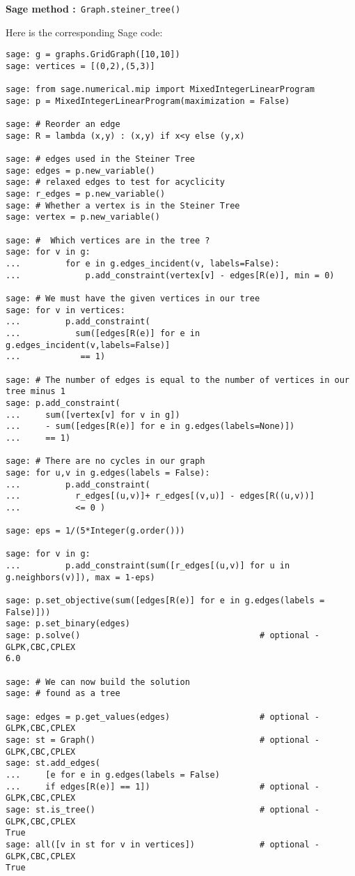 {\bf Sage method :}\verb! Graph.steiner_tree()!

Here is the corresponding Sage code:

\begin{lstlisting}
sage: g = graphs.GridGraph([10,10])
sage: vertices = [(0,2),(5,3)]

sage: from sage.numerical.mip import MixedIntegerLinearProgram
sage: p = MixedIntegerLinearProgram(maximization = False)

sage: # Reorder an edge
sage: R = lambda (x,y) : (x,y) if x<y else (y,x)

sage: # edges used in the Steiner Tree
sage: edges = p.new_variable()
sage: # relaxed edges to test for acyclicity
sage: r_edges = p.new_variable()
sage: # Whether a vertex is in the Steiner Tree
sage: vertex = p.new_variable()

sage: #  Which vertices are in the tree ?
sage: for v in g:
...         for e in g.edges_incident(v, labels=False):
...             p.add_constraint(vertex[v] - edges[R(e)], min = 0)

sage: # We must have the given vertices in our tree
sage: for v in vertices:
...         p.add_constraint(
...           sum([edges[R(e)] for e in g.edges_incident(v,labels=False)]
...            == 1)

sage: # The number of edges is equal to the number of vertices in our tree minus 1
sage: p.add_constraint(
...     sum([vertex[v] for v in g])
...     - sum([edges[R(e)] for e in g.edges(labels=None)])
...     == 1)

sage: # There are no cycles in our graph
sage: for u,v in g.edges(labels = False):
...         p.add_constraint(
...           r_edges[(u,v)]+ r_edges[(v,u)] - edges[R((u,v))]
...           <= 0 )

sage: eps = 1/(5*Integer(g.order()))

sage: for v in g:
...         p.add_constraint(sum([r_edges[(u,v)] for u in g.neighbors(v)]), max = 1-eps)

sage: p.set_objective(sum([edges[R(e)] for e in g.edges(labels = False)]))
sage: p.set_binary(edges)
sage: p.solve()                                    # optional - GLPK,CBC,CPLEX
6.0

sage: # We can now build the solution
sage: # found as a tree

sage: edges = p.get_values(edges)                  # optional - GLPK,CBC,CPLEX
sage: st = Graph()                                 # optional - GLPK,CBC,CPLEX
sage: st.add_edges(
...     [e for e in g.edges(labels = False)
...     if edges[R(e)] == 1])                      # optional - GLPK,CBC,CPLEX
sage: st.is_tree()                                 # optional - GLPK,CBC,CPLEX
True
sage: all([v in st for v in vertices])             # optional - GLPK,CBC,CPLEX
True
\end{lstlisting}


